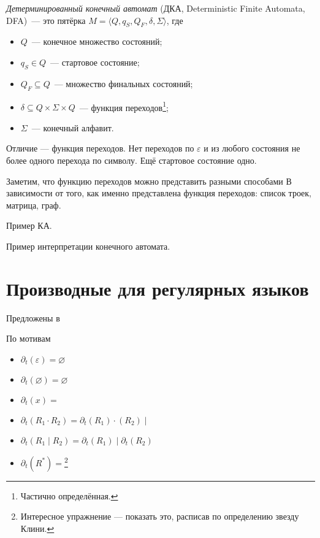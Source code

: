 \begin{definition}
    \label{def:DeterminicticFiniteAutomata}
    \emph{Детерминированный конечный автомат} (ДКА, Deterministic Finite Automata, DFA)~--- это пятёрка $M = \langle Q, q_S, Q_F, \delta, \Sigma \rangle$, где
    \begin{itemize}
        \item $Q$~--- конечное множество состояний;
        \item $q_S \in Q$~--- стартовое состояние;
        \item $Q_F \subseteq Q$~--- множество финальных состояний;
        \item $\delta \subseteq Q \times \Sigma \times Q$~--- функция переходов\footnote{Частично определённая.};
        \item $\Sigma$~--- конечный алфавит.
    \end{itemize}
\end{definition}

Отличие --- функция переходов. Нет переходов по $\varepsilon$ и из любого состояния не более одного перехода по символу.
Ещё стартовое состояние одно.

Заметим, что функцию переходов можно представить разными способами В зависимости от того, как именно представлена функция переходов: список троек, матрица, граф.

\begin{example}
    Пример КА.

\end{example}

\begin{example}
    Пример интерпретации конечного автомата.
\end{example}

\section{Производные для регулярных языков}

Предложены в~\cite{Brzozowski1964}

По мотивам~\cite{OWENS_REPPY_TURON_2009}

\begin{itemize}
    \item $\partial_t(\varepsilon) = \varnothing$
    \item $\partial_t(\varnothing) = \varnothing$
    \item $\partial_t(x) = $
    \item $\partial_t(R_1 \cdot R_2) = \partial_t(R_1) \cdot (R_2) \mid $
    \item $\partial_t(R_1 \mid R_2) = \partial_t(R_1) \mid \partial_t(R_2) $
    \item $\partial_t(R^*) = $\footnote{Интересное упражнение --- показать это, расписав по определению звезду Клини.}
\end{itemize}


